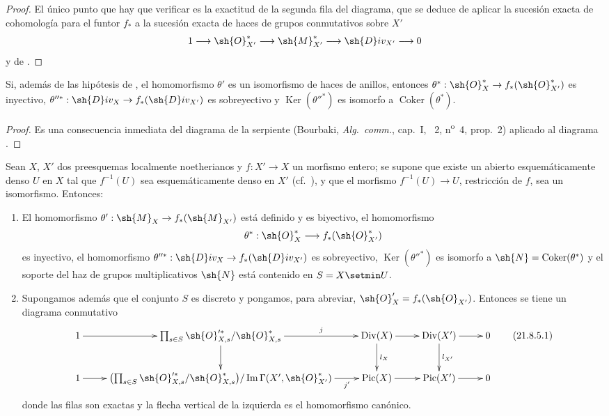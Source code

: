 \begin{proof}
El único punto que hay que verificar es la exactitud de la segunda fila del diagrama, que se deduce de aplicar la sucesión exacta de cohomología para el funtor $f_*$ a la sucesión exacta de haces de grupos conmutativos sobre $X'$
\[
  1\to\sh{O}^*_{X'}\to\sh{M}^*_{X'}\to\sh{D}iv_{X'}\to0
\]
y de .
\end{proof}


\begin{corollary}[21.8.4]
\label{IV.21.8.4}
Si, además de las hipótesis de , el homomorfismo $\theta'$ es un isomorfismo de haces de anillos, entonces $\theta^*:\sh{O}^*_X\to f_*(\sh{O}^*_{X'})$ es inyectivo, $\theta''^*:\sh{D}iv_X\to f_*(\sh{D}iv_{X'})$ es sobreyectivo y $\operatorname{Ker}(\theta''^*)$ es isomorfo a $\operatorname{Coker}(\theta^*)$.
\end{corollary}

\begin{proof}
Es una consecuencia inmediata del diagrama de la serpiente (Bourbaki, \emph{Alg.\ comm.}, cap.~I, \textsection~2, n\textsuperscript{o}~4, prop.~2) aplicado al diagrama .
\end{proof}



\begin{proposition}[21.8.5]
\label{IV.21.8.5}
Sean $X$, $X'$ dos preesquemas localmente noetherianos y $f:X'\to X$ un morfismo entero;
se supone que existe un abierto esquemáticamente denso $U$ en $X$ tal que $f^{-1}(U)$ sea esquemáticamente denso en $X'$ \textup{(cf.\ )}, y que el morfismo $f^{-1}(U)\to U$, restricción de $f$, sea un isomorfismo.
Entonces:
\begin{enumerate}[label=\textup{(\roman*)}]
  \item El homomorfismo $\theta':\sh{M}_X\to f_*(\sh{M}_{X'})$ está definido y es biyectivo, el homomorfismo
\[
  \theta^*:\sh{O}^*_X\to f_*(\sh{O}^*_{X'})
\]
es inyectivo, el homomorfismo $\theta''^*:\sh{D}iv_X\to f_*(\sh{D}iv_{X'})$ es sobreyectivo, $\operatorname{Ker}(\theta''^*)$ es isomorfo a $\sh{N}=\operatorname{Coker}(\theta^*)$ y el soporte del haz de grupos multiplicativos $\sh{N}$ está contenido en $S=X\setmin U$.
  \item Supongamos además que el conjunto $S$ es discreto y pongamos, para abreviar, $\sh{O}'_X=f_*(\sh{O}_{X'})$.
Entonces se tiene un diagrama conmutativo
\[
\label{IV.21.8.5.1}
  \xymatrix{
    1 \ar[r] & \prod_{s\in S}\sh{O}'^{*}_{X,s}/\sh{O}^*_{X,s} \ar[r]^-{j} \ar[d] & \operatorname{Div}(X) \ar[r] \ar[d]^{l_X} & \operatorname{Div}(X') \ar[r] \ar[d]^{l_{X'}} & 0\\
    1 \ar[r] & \bigl(\prod_{s\in S}\sh{O}'^{*}_{X,s}/\sh{O}^*_{X,s}\bigr)/\operatorname{Im}\Gamma(X',\sh{O}^*_{X'}) \ar[r]_-{j'} & \operatorname{Pic}(X) \ar[r] & \operatorname{Pic}(X') \ar[r] & 0
  }
  \tag{21.8.5.1}
\]
donde las filas son exactas y la flecha vertical de la izquierda es el homomorfismo canónico.
\end{enumerate}
\end{proposition}

